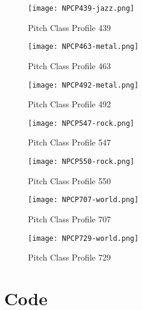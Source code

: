 \documentclass{article} %
\begin{document}
\begin{figure}[H]
\centering
\texttt{[image: NPCP439-jazz.png]}
\caption{Pitch Class Profile 439}
\label{fig:NPCP439_1}
\end{figure}

\begin{figure}[H]
\centering
\texttt{[image: NPCP463-metal.png]}
\caption{Pitch Class Profile 463}
\label{fig:NPCP463_1}
\end{figure}

\begin{figure}[H]
\centering
\texttt{[image: NPCP492-metal.png]}
\caption{Pitch Class Profile 492}
\label{fig:NPCP492_1}
\end{figure}

\begin{figure}[H]
\centering
\texttt{[image: NPCP547-rock.png]}
\caption{Pitch Class Profile 547}
\label{fig:NPCP547_1}
\end{figure}

\begin{figure}[H]
\centering
\texttt{[image: NPCP550-rock.png]}
\caption{Pitch Class Profile 550}
\label{fig:NPCP550_1}
\end{figure}

\begin{figure}[H]
\centering
\texttt{[image: NPCP707-world.png]}
\caption{Pitch Class Profile 707}
\label{fig:NPCP707_1}
\end{figure}

\begin{figure}[H]
\centering
\texttt{[image: NPCP729-world.png]}
\caption{Pitch Class Profile 729}
\label{fig:NPCP729_1}
\end{figure}
\clearpage

\clearpage
\section{Code}







 
 
\end{document}
